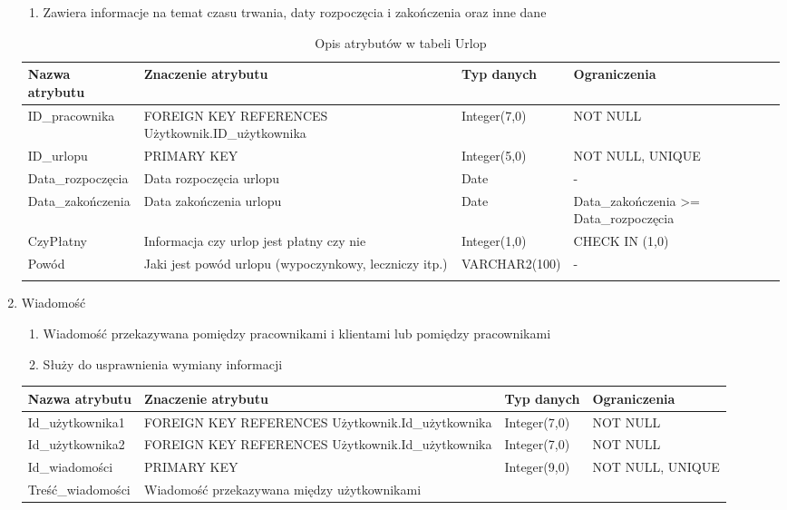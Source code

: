 \begin{enumerate}
\begin{enumerate}
  	  \item Zawiera informacje na temat czasu trwania, daty rozpoczęcia i
  	  zakończenia oraz inne dane
  	\end{enumerate}
  	{\footnotesize
  	\begin{longtable}{|p{3cm}|p{5cm}|p{2.5cm}|p{2.5cm}|}
  	\hline
  	\textbf{Nazwa atrybutu} & \textbf{Znaczenie atrybutu} & \textbf{Typ danych} &
  	\textbf{Ograniczenia} \\
  	\hline
  	ID\_pracownika & FOREIGN KEY REFERENCES Użytkownik.ID\_użytkownika  &
  	Integer(7,0) & NOT NULL
  	\\
  	\hline
  	ID\_urlopu & PRIMARY KEY & Integer(5,0) & NOT NULL, UNIQUE  \\
  	\hline
  	Data\_rozpoczęcia & Data rozpoczęcia urlopu & Date & -  \\
  	\hline
  	Data\_zakończenia & Data zakończenia urlopu & Date & Data\_zakończenia >=
  	Data\_rozpoczęcia
  	\\
  	\hline
  	CzyPłatny & Informacja czy urlop jest płatny czy nie & Integer(1,0) & CHECK
  	IN (1,0) \\
  	\hline
  	Powód & Jaki jest powód urlopu (wypoczynkowy, leczniczy itp.) & VARCHAR2(100)
  	& - \\
  	\hline
	\caption{Opis atrybutów w tabeli Urlop}
	\end{longtable}}
  \item Wiadomość
  	\begin{enumerate}
  	  \item Wiadomość przekazywana pomiędzy pracownikami i klientami lub pomiędzy
  	  pracownikami
  	  \item Służy do usprawnienia wymiany informacji
  	\end{enumerate}
  	{\footnotesize
  	\begin{longtable}{|p{3cm}|p{5cm}|p{2.5cm}|p{2.5cm}|}
  	\hline
  	\textbf{Nazwa atrybutu} & \textbf{Znaczenie atrybutu} & \textbf{Typ danych} &
  	\textbf{Ograniczenia} \\
  	\hline
  	Id\_użytkownika1 & FOREIGN KEY REFERENCES Użytkownik.Id\_użytkownika  &
  	Integer(7,0) & NOT NULL
  	\\
  	\hline
  	Id\_użytkownika2 & FOREIGN KEY REFERENCES Użytkownik.Id\_użytkownika &
  	Integer(7,0) & NOT NULL
  	\\
  	\hline
  	Id\_wiadomości & PRIMARY KEY & Integer(9,0) & NOT NULL, UNIQUE  \\
  	\hline
  	Treść\_wiadomości & Wiadomość przekazywana między użytkownikami &

\end{longtable}}
\end{enumerate}
